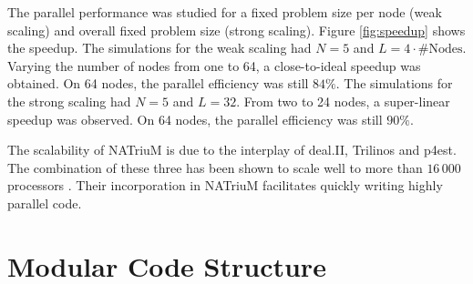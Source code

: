 \documentclass[1p, sort&compress]{elsarticle}
\begin{document}

The parallel performance was studied for a fixed problem size per node (weak scaling) and overall fixed problem size (strong scaling). Figure \ref{fig:speedup} shows the speedup. The simulations for the weak scaling had $N=5$ and $L=4\cdot{\#}\mathrm{Nodes}.$ Varying the number of nodes from one to 64, a close-to-ideal speedup was obtained. On 64 nodes, the parallel efficiency was still $84{\%}.$ The simulations for the strong scaling had $N=5$ and $L=32$. From two to 24 nodes, a super-linear speedup was observed. On 64 nodes, the parallel efficiency was still $90{\%}.$

The scalability of NATriuM is due to the interplay of deal.II, Trilinos and p4est. The combination of these three has been shown to scale well to more than $16\, 000$ processors \cite{Bangerth.2011}. Their incorporation in NATriuM facilitates quickly writing highly parallel code.

\section{Modular Code Structure}
\end{document}
